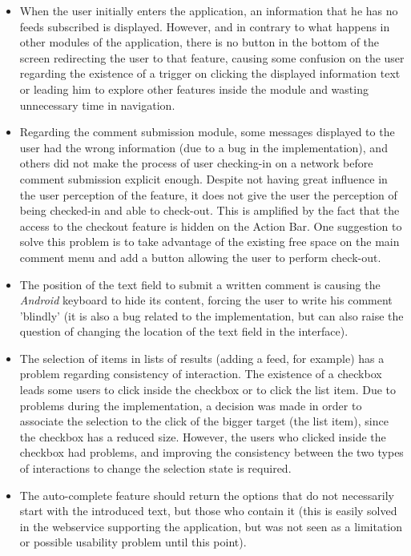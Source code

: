 \begin{itemize}
\item When the user initially enters the application, an information that he has no feeds subscribed is displayed. However, and in contrary to what happens in other modules of the application, there is no button in the bottom of the screen redirecting the user to that feature, causing some confusion on the user regarding the existence of a trigger on clicking the displayed information text or leading him to explore other features inside the module and wasting unnecessary time in navigation.

\item Regarding the comment submission module, some messages displayed to the user had the wrong information (due to a bug in the implementation), and others did not make the process of user checking-in on a network before comment submission explicit enough. Despite not having great influence in the user perception of the feature, it does not give the user the perception of being checked-in and able to check-out. This is amplified by the fact that the access to the checkout feature is hidden on the Action Bar.
One suggestion to solve this problem is to take advantage of the existing free space on the main comment menu and add a button allowing the user to perform check-out.

\item The position of the text field to submit a written comment is causing the \emph{Android} keyboard to hide its content, forcing the user to write his comment 'blindly' (it is also a bug related to the implementation, but can also raise the question of changing the location of the text field in the interface).

\item The selection of items in lists of results (adding a feed, for example) has a problem regarding consistency of interaction. The existence of a checkbox leads some users to click inside the checkbox or to click the list item. Due to problems during the implementation, a decision was made in order to associate the selection to the click of the bigger target (the list item), since the checkbox has a reduced size. However, the users who clicked inside the checkbox had problems, and improving the consistency between the two types of interactions to change the selection state is required.

\item The auto-complete feature should return the options that do not necessarily start with the introduced text, but those who contain it (this is easily solved in the webservice supporting the application, but was not seen as a limitation or possible usability problem until this point).


\end{itemize}
